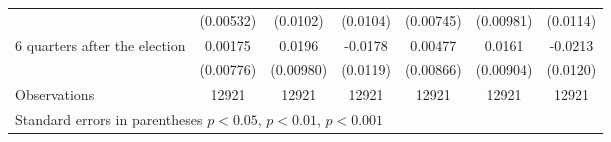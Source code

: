 \begin{table}[!ht]
\begin{tabular}{l*{6}{c}}
                    &   (0.00532)         &    (0.0102)         &    (0.0104)         &   (0.00745)         &   (0.00981)         &    (0.0114)         \\
[0,5em]
 6 quarters after the election&     0.00175         &      0.0196\sym{*}  &     -0.0178         &     0.00477         &      0.0161         &     -0.0213         \\
                    &   (0.00776)         &   (0.00980)         &    (0.0119)         &   (0.00866)         &   (0.00904)         &    (0.0120)         \\
\hline
Observations        &       12921         &       12921         &       12921         &       12921         &       12921         &       12921         \\
\hline\hline
\multicolumn{7}{l}{\footnotesize Standard errors in parentheses \sym{*} \(p<0.05\), \sym{**} \(p<0.01\), \sym{***} \(p<0.001\)}\\
\end{tabular}
\end{table}
